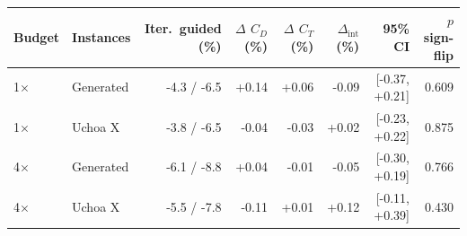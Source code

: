 \begin{tabular}{llrrrrrr}
\toprule
Budget & Instances & Iter.\ guided (\%) & $\Delta$ $C_D$ (\%) & $\Delta$ $C_T$ (\%) & $\Delta_{\mathrm{int}}$ (\%) & 95\% CI & $p$ sign-flip \\
\midrule
1$\times$ & Generated & -4.3 / -6.5 & +0.14 & +0.06 & -0.09 & [-0.37, +0.21] & 0.609 \\
1$\times$ & Uchoa X & -3.8 / -6.5 & -0.04 & -0.03 & +0.02 & [-0.23, +0.22] & 0.875 \\
4$\times$ & Generated & -6.1 / -8.8 & +0.04 & -0.01 & -0.05 & [-0.30, +0.19] & 0.766 \\
4$\times$ & Uchoa X & -5.5 / -7.8 & -0.11 & +0.01 & +0.12 & [-0.11, +0.39] & 0.430 \\
\bottomrule
\end{tabular}
